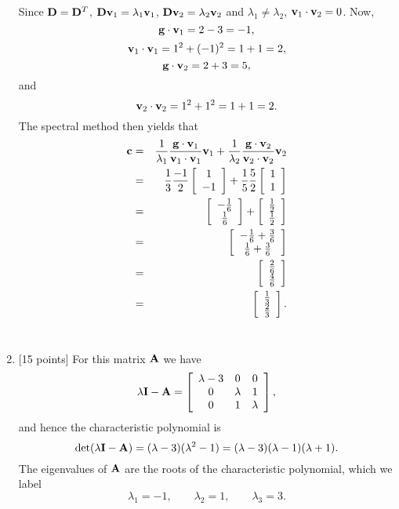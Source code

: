 \begin{solution}
\begin{enumerate}
Since ${\bf D}={\bf D}^T$, ${\bf D}{\bf v}_1=\lambda_1{\bf v}_1$, ${\bf D}{\bf v}_2=\lambda_2{\bf v}_2$ and $\lambda_1\ne\lambda_2$, ${\bf v}_1\cdot{\bf v}_2=0$. Now,
\[
{\bf g}\cdot{\bf v}_1=2-3=-1,
\]
\[
{\bf v}_1\cdot{\bf v}_1=1^2+(-1)^2=1+1=2,
\]
\[
{\bf g}\cdot{\bf v}_2=2+3=5,
\]
and
\[
{\bf v}_2\cdot{\bf v}_2=1^2+1^2=1+1=2.
\]
The spectral method then yields that
\begin{eqnarray*}
{\bf c}&=&{1\over\lambda_1}{{\bf g}\cdot{\bf v}_1\over{\bf v}_1\cdot{\bf v}_1}{\bf v}_1+{1\over\lambda_2}{{\bf g}\cdot{\bf v}_2\over{\bf v}_2\cdot{\bf v}_2}{\bf v}_2
\\
&=&{1\over3}{-1\over2}\left[\begin{array}{c}1 \\ -1\end{array}\right]+{1\over5}{5\over2}\left[\begin{array}{c}1 \\ 1\end{array}\right]
\\
&=&\left[\begin{array}{c}-{1\over6} \\ {1\over6}\end{array}\right]+\left[\begin{array}{c}{1\over2} \\ {1\over2}\end{array}\right]
\\
&=&\left[\begin{array}{c}-{1\over6}+{3\over6} \\ {1\over6}+{3\over6}\end{array}\right]
\\
&=&\left[\begin{array}{c}{2\over6} \\ {4\over6}\end{array}\right]
\\
&=&\left[\begin{array}{c}{1\over3} \\ {2\over3}\end{array}\right].
\end{eqnarray*}
\\
\item {[15 points]} For this matrix ${\bf A}$ we have
\[ \lambda{\bf I} - {\bf A} = \left[\begin{array}{ccc}\lambda-3 & 0 & 0 \\ 0 & \lambda & 1 \\ 0 & 1 & \lambda\end{array}\right],\]
and hence the characteristic polynomial is 
\[ \det(\lambda{\bf I} - {\bf A}) = (\lambda-3)(\lambda^2 - 1) = (\lambda-3)(\lambda-1)(\lambda+1).\]
The eigenvalues of ${\bf A}$ are the roots of the characteristic polynomial, which we label
\[ \lambda_1 = -1, \qquad
   \lambda_2 = 1, \qquad
   \lambda_3 = 3.\]


\end{enumerate}
\end{solution}
